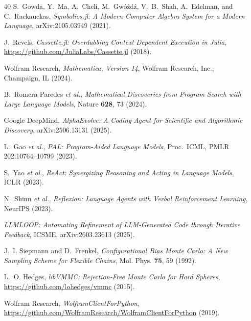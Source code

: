 \documentclass[twocolumn,10pt]{article}
\begin{document}
\begin{thebibliography}{40}
S.~Gowda, Y.~Ma, A.~Cheli, M.~Gw\'{o}\'{z}d\'{z}, V.~B.~Shah,
A.~Edelman, and C.~Rackauckas,
\textit{Symbolics.jl: A Modern Computer Algebra System for a Modern
  Language},
arXiv:2105.03949 (2021).

J.~Revels,
\textit{Cassette.jl: Overdubbing Context-Dependent Execution in Julia},
\url{https://github.com/JuliaLabs/Cassette.jl} (2018).

Wolfram Research,
\textit{Mathematica, Version 14},
Wolfram Research, Inc., Champaign, IL (2024).

B.~Romera-Paredes \textit{et al.},
\textit{Mathematical Discoveries from Program Search with Large Language
  Models},
Nature \textbf{628}, 73 (2024).

Google DeepMind,
\textit{AlphaEvolve: A Coding Agent for Scientific and Algorithmic
  Discovery},
arXiv:2506.13131 (2025).

L.~Gao \textit{et al.},
\textit{PAL: Program-Aided Language Models},
Proc.\ ICML, PMLR 202:10764--10799 (2023).

S.~Yao \textit{et al.},
\textit{ReAct: Synergizing Reasoning and Acting in Language Models},
ICLR (2023).

N.~Shinn \textit{et al.},
\textit{Reflexion: Language Agents with Verbal Reinforcement Learning},
NeurIPS (2023).

\textit{LLMLOOP: Automating Refinement of LLM-Generated Code through
  Iterative Feedback},
ICSME, arXiv:2603.23613 (2025).

J.~I. Siepmann and D.~Frenkel,
\textit{Configurational Bias Monte Carlo: A New Sampling Scheme for
  Flexible Chains},
Mol. Phys. \textbf{75}, 59 (1992).

L.~O. Hedges,
\textit{libVMMC: Rejection-Free Monte Carlo for Hard Spheres},
\url{https://github.com/lohedges/vmmc} (2015).

Wolfram Research,
\textit{WolframClientForPython},
\url{https://github.com/WolframResearch/WolframClientForPython} (2019).

\end{thebibliography}
\end{document}
